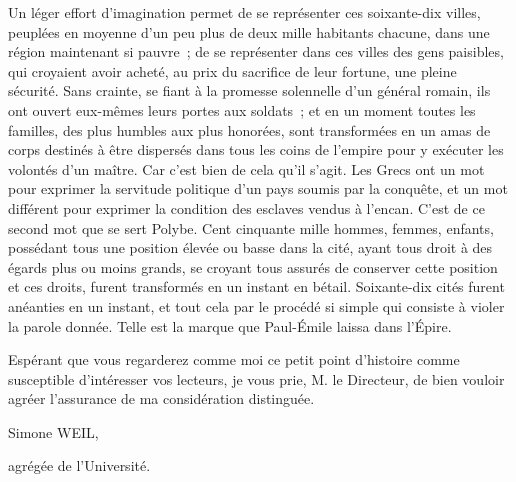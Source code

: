 \documentclass[french,twoside]{book} %
\begin{document}
Un léger effort d'imagination permet de se représenter ces soixante-dix villes, peuplées en moyenne d'un peu plus de deux mille habitants chacune, dans une région maintenant si pauvre ; de se représenter dans ces villes des gens paisibles, qui croyaient avoir acheté, au prix du sacrifice de leur fortune, une pleine sécurité. Sans crainte, se fiant à la promesse solennelle d'un général romain, ils ont ouvert eux-mêmes leurs portes aux soldats ; et en un moment toutes les familles, des plus humbles aux plus honorées, sont transformées en un amas de corps destinés à être dispersés dans tous les coins de l'empire pour y exécuter les volontés d'un maître. Car c'est bien de cela qu'il s'agit. Les Grecs ont un mot pour exprimer la servitude politique d'un pays soumis par la conquête, et un mot différent pour exprimer la condition des esclaves vendus à l'encan. C'est de ce second mot que se sert Polybe. Cent cinquante mille hommes, femmes, enfants, possédant tous une position élevée ou basse dans la cité, ayant tous droit à des égards plus ou moins grands, se croyant tous assurés de conserver cette position et ces droits, furent transformés en un instant en bétail. Soixante-dix cités furent anéanties en un instant, et tout cela par le procédé si simple qui consiste à violer la parole donnée. Telle est la marque que Paul-Émile laissa dans l'Épire.\par
Espérant que vous regarderez comme moi ce petit point d'histoire comme susceptible d'intéresser vos lecteurs, je vous prie, M. le Directeur, de bien vouloir agréer l'assurance de ma considération distinguée.\par
Simone WEIL,\par
agrégée de l'Université.\par

\begin{center}
\noindent \centerline{}
\end{center}
\end{document}
